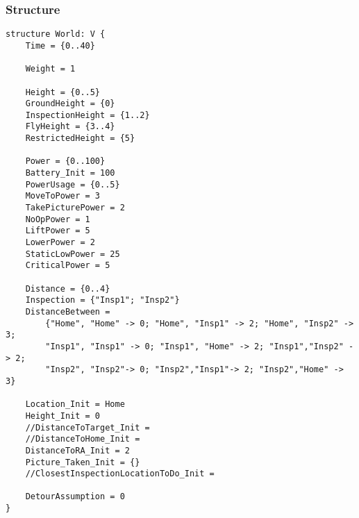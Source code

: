 \documentclass[12pt]{extarticle}
\begin{document}
\subsubsection*{Structure}
\begin{lstlisting}[basicstyle=\tiny]
structure World: V {
    Time = {0..40}
    
    Weight = 1

    Height = {0..5}
    GroundHeight = {0}
    InspectionHeight = {1..2}
    FlyHeight = {3..4}
    RestrictedHeight = {5}
    
    Power = {0..100}
    Battery_Init = 100
    PowerUsage = {0..5}
    MoveToPower = 3
    TakePicturePower = 2
    NoOpPower = 1
    LiftPower = 5
    LowerPower = 2
    StaticLowPower = 25
    CriticalPower = 5
    
    Distance = {0..4}
    Inspection = {"Insp1"; "Insp2"}
    DistanceBetween =
    	{"Home", "Home" -> 0; "Home", "Insp1" -> 2; "Home", "Insp2" -> 3;
        "Insp1", "Insp1" -> 0; "Insp1", "Home" -> 2; "Insp1","Insp2" -> 2;
    	"Insp2", "Insp2"-> 0; "Insp2","Insp1"-> 2; "Insp2","Home" -> 3}

    Location_Init = Home
    Height_Init = 0
    //DistanceToTarget_Init =
    //DistanceToHome_Init =
    DistanceToRA_Init = 2
    Picture_Taken_Init = {}
    //ClosestInspectionLocationToDo_Init =
    
    DetourAssumption = 0
}
\end{lstlisting}
\end{document}
